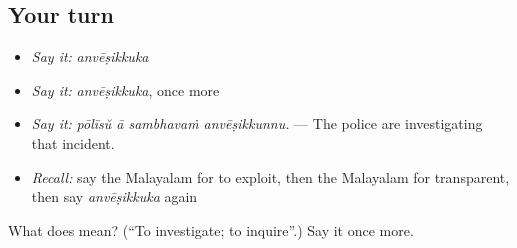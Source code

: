 \subsection*{Your turn}
\begin{itemize}
\raggedright
  \item \emph{Say it:} \emph{anvēṣikkuka}
  \item \emph{Say it:} \emph{anvēṣikkuka}, once more
  \item \emph{Say it:} \emph{pōlīsŭ ā sambhavaṁ anvēṣikkunnu.} — The police are investigating that incident.
  \item \emph{Recall:} say the Malayalam for to exploit, then the Malayalam for transparent, then say \emph{anvēṣikkuka} again
\end{itemize}

\begin{tcolorbox}[breakable,colback=teal!4,colframe=teal!35!black,title={Before you move on}]
What does  mean? (\textquotedblleft{}To investigate; to inquire\textquotedblright{}.) Say it once more.
\end{tcolorbox}

